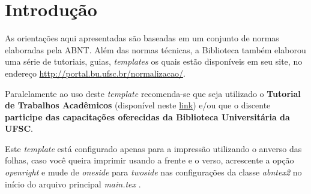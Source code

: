 \documentclass[
	12pt,				%
	oneside,			%
	a4paper,			%
	chapter=TITLE,		%
	section=TITLE,		%
	english,			%
	brazil				%
	]{abntex2}
\begin{document}
{%
	\hypersetup{hidelinks}
	\listoffigures*
	\cleardoublepage


	\listoftables*
	\cleardoublepage

	\imprimirlistadesiglas

	\imprimirlistadesimbolos

	\tableofcontents*
	\cleardoublepage

}%


\textual

\chapter{Introdução}\label{intro}

As orientações aqui apresentadas são baseadas em um conjunto de normas
elaboradas pela \gls{ABNT}. Além das normas técnicas, a Biblioteca também
elaborou uma série de tutoriais, guias, \emph{templates} os quais estão disponíveis
em seu site, no endereço \url{http://portal.bu.ufsc.br/normalizacao/}.

Paralelamente ao uso deste \emph{template} recomenda-se que seja utilizado o
\textbf{Tutorial de Trabalhos Acadêmicos} (disponível neste
\href{/url\%7Bhttps://repositorio.ufsc.br/handle/123456789/180829}{link}) e/ou que o
discente \textbf{participe das capacitações oferecidas da Biblioteca Universitária da
UFSC}.

Este \emph{template} está configurado apenas para a impressão utilizando o
anverso das folhas, caso você queira imprimir usando a frente e o verso,
acrescente a opção \emph{openright} e mude de \emph{oneside} para
\emph{twoside} nas configurações da classe \emph{abntex2} no início do
arquivo principal \emph{main.tex} \autocite{abntex2classe}.
\end{document}
